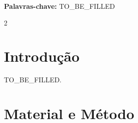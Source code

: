 \documentclass[10pt,a4paper]{article}
\newcommand{\palavraschave}[1]{%
  \noindent\textbf{Palavras-chave:} #1\par
  \vspace{4pt}
}
\begin{document}
%
%
%

\palavraschave{
TO\_BE\_FILLED
}



\begin{multicols}{2}



\section{Introdução}

%
%
%
%
%
%

TO\_BE\_FILLED.

%
%
%
%
%
%



\section{Material e Método}


\end{multicols}
\end{document}
